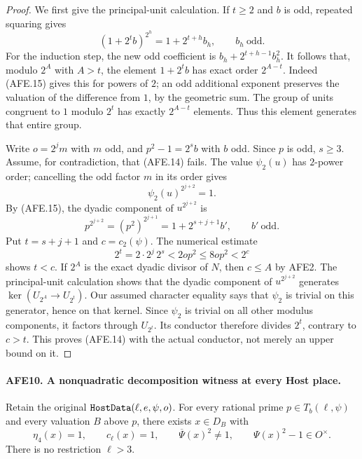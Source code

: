 \documentclass[11pt,a4paper]{article}
\numberwithin{equation}{section}
\theoremstyle{remark}\newtheorem{remark}[theorem]{Remark}
\begin{document}
\begin{proof}
We first give the principal-unit calculation.
If \(t\ge2\) and \(b\) is odd, repeated squaring gives
\[
             (1+2^t b)^{2^h}
                    =1+2^{t+h}b_h,\qquad b_h\ \text{odd}.
                                                        \tag{AFE.15}
\]
For the induction step, the new odd coefficient is
\(b_h+2^{t+h-1}b_h^2\).
It follows that, modulo \(2^A\) with \(A>t\),
the element \(1+2^t b\) has exact order \(2^{A-t}\).
Indeed (AFE.15) gives this for powers of \(2\);
an odd additional exponent preserves the valuation
of the difference from \(1\), by the geometric sum.
The group of units congruent to \(1\) modulo \(2^t\)
has exactly \(2^{A-t}\) elements.  Thus this element
generates that entire group.

Write \(o=2^j m\) with \(m\) odd, and
\(p^2-1=2^s b\) with \(b\) odd.
Since \(p\) is odd, \(s\ge3\).
Assume, for contradiction, that (AFE.14) fails.
The value \(\psi_2(u)\) has \(2\)-power order;
cancelling the odd factor \(m\) in its order gives
\[
                         \psi_2(u)^{2^{j+2}}=1.
 \]
By (AFE.15), the dyadic component of
\(u^{2^{j+2}}\) is
\[
         p^{2^{j+2}}=(p^2)^{2^{j+1}}
                    =1+2^{s+j+1}b',\qquad b'\ \text{odd}.
 \]
Put \(t=s+j+1\) and \(c=c_2(\psi)\).
The numerical estimate
\[
        2^t=2\cdot2^j\,2^s
                    <2op^2\le8op^2<2^c
 \]
shows \(t<c\).
If \(2^A\) is the exact dyadic divisor of \(N\),
then \(c\le A\) by AFE2.
The principal-unit calculation shows that the dyadic
component of \(u^{2^{j+2}}\) generates
\(\ker(U_{2^A}\to U_{2^t})\).
Our assumed character equality says that \(\psi_2\)
is trivial on this generator, hence on that kernel.
Since \(\psi_2\) is trivial on all other modulus
components, it factors through \(U_{2^t}\).
Its conductor therefore divides \(2^t\), contrary
to \(c>t\).
This proves (AFE.14) with the actual conductor,
not merely an upper bound on it.
\end{proof}

\paragraph{AFE10. A nonquadratic decomposition witness at every Host place.}
\label{claim:AFE10}
Retain the original
\(\texttt{Host\allowbreak Data}(\ell,e,\psi,o)\).
For every rational prime \(p\in T_b(\ell,\psi)\)
and every valuation \(B\) above \(p\), there exists
\(x\in D_B\) with
\[
 \eta_4(x)=1,\qquad c_\ell(x)=1,\qquad
 \overline\Psi(x)^2\ne1,\qquad
                         \Psi(x)^2-1\in O^\times.
                                                        \tag{AFE.16}
\]
There is no restriction \(\ell>3\).
\end{document}
